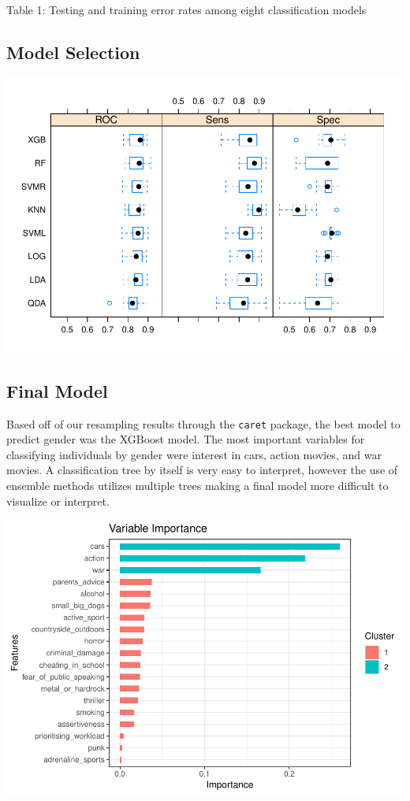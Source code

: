 \documentclass[]{article}
\begin{document}
Table 1: Testing and training error rates among eight classification
models

\subsection{Model Selection}\label{model-selection}

\includegraphics{final_report_files/figure-latex/unnamed-chunk-13-1.pdf}

\subsection{Final Model}\label{final-model}

Based off of our resampling results through the \texttt{caret} package,
the best model to predict gender was the XGBoost model. The most
important variables for classifying individuals by gender were interest
in cars, action movies, and war movies. A classification tree by itself
is very easy to interpret, however the use of ensemble methods utilizes
multiple trees making a final model more difficult to visualize or
interpret.

\includegraphics{final_report_files/figure-latex/unnamed-chunk-14-1.pdf}
\end{document}
